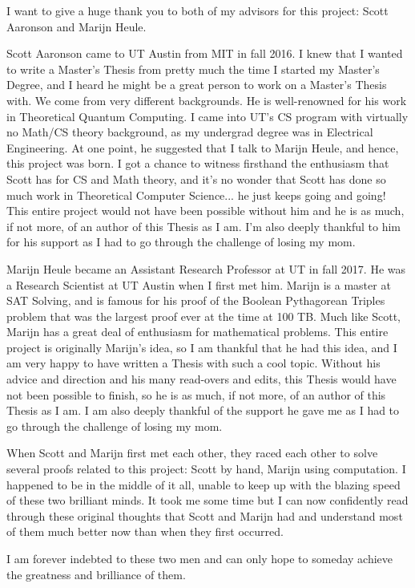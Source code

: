 \documentclass[12pt]{report}	%
\begin{document}
\begin{acknowledgments}		%
%
I want to give a huge thank you to both of my advisors for this project: Scott Aaronson and Marijn Heule. \par
Scott Aaronson came to UT Austin from MIT in fall 2016. I knew that I wanted to write a Master's Thesis from pretty much the time I started my Master's Degree, and I heard he might be a great person to work on a Master's Thesis with. We come from very different backgrounds. He is well-renowned for his work in Theoretical Quantum Computing. I came into UT's CS program with virtually no Math/CS theory background, as my undergrad degree was in Electrical Engineering. At one point, he suggested that I talk to Marijn Heule, and hence, this project was born. I got a chance to witness firsthand the enthusiasm that Scott has for CS and Math theory, and it's no wonder that Scott has done so much work in Theoretical Computer Science... he just keeps going and going! This entire project would not have been possible without him and he is as much, if not more, of an author of this Thesis as I am. I'm also deeply thankful to him for his support as I had to go through the challenge of losing my mom.\par
Marijn Heule became an Assistant Research Professor at UT in fall 2017. He was a Research Scientist at UT Austin when I first met him. Marijn is a master at SAT Solving, and is famous for his proof of the Boolean Pythagorean Triples problem that was the largest proof ever at the time at 100 TB. Much like Scott, Marijn has a great deal of enthusiasm for mathematical problems. This entire project is originally Marijn's idea, so I am thankful that he had this idea, and I am very happy to have written a Thesis with such a cool topic. Without his advice and direction and his many read-overs and edits, this Thesis would have not been possible to finish, so he is as much, if not more, of an author of this Thesis as I am. I am also deeply thankful of the support he gave me as I had to go through the challenge of losing my mom.\par
When Scott and Marijn first met each other, they raced each other to solve several proofs related to this project: Scott by hand, Marijn using computation. I happened to be in the middle of it all, unable to keep up with the blazing speed of these two brilliant minds. It took me some time but I can now confidently read through these original thoughts that Scott and Marijn had and understand most of them much better now than when they first occurred. \par
I am forever indebted to these two men and can only hope to someday achieve the greatness and brilliance of them.
\end{acknowledgments}
\end{document}
